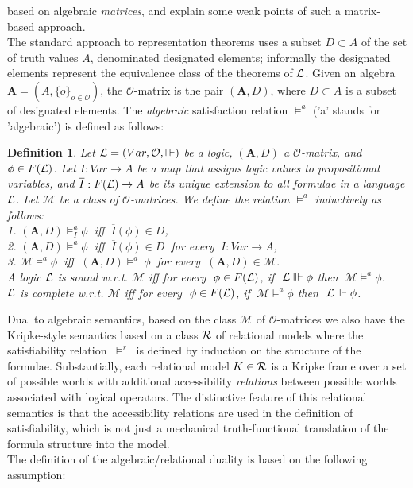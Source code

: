 \documentclass[10pt,twocolumn]{article}
\newcommand{\M}{\mathcal{M}} \newcommand{\N}{\mathcal{N}}
\renewcommand{\O}{\mathcal{O}} \renewcommand{\P}{\mathcal{P}}
\newtheorem{definition}{Definition}
\begin{document}
based on
algebraic \emph{matrices}, and explain some weak points of such a matrix-based approach.\\
  The standard approach to representation
theorems uses a subset $D \subset A$ of the set of truth values $A$,
denominated designated elements; informally the
designated elements represent the equivalence class of the theorems
of $\mathcal{L}$. Given an algebra $\textbf{A} = (A, \{o\}_{o \in \O})$, the
$\O$-matrix is the pair $(\textbf{A},D)$, where $D \subset A$ is a
subset of designated elements. The \emph{algebraic} satisfaction
relation $\models^a$ ('a' stands for 'algebraic') is defined as
follows:
\begin{definition} \label{def:matr} Let $\L = (Var, \O,
\Vvdash)$ be a logic, $(\textbf{A},D)$ a $\O$-matrix, and $\phi \in
F(\mathcal{L})$. Let $I:Var \rightarrow A$ be a map that assigns logic values
to propositional variables, and $\overline{I}:F(\mathcal{L}) \rightarrow A$
be its unique extension to all formulae in a language $\mathcal{L}$. Let $\M$
be a class of $\O$-matrices. We  define  the relation $\models^a$
inductively as
follows:\\
1. $(\textbf{A},D)\models^a_I\phi~$ iff $~ \overline{I}(\phi)
\in D$,\\
2. $(\textbf{A},D)\models^a\phi~$ iff $~\overline{I}(\phi)
\in D~$ for every $~I:Var \rightarrow A$,\\
3. $\M \models^a\phi~$ iff $~(\textbf{A},D)\models^a~\phi~$
for every $~(\textbf{A},D) \in \M$.\\
A logic $\mathcal{L}$ is sound w.r.t. $\M$ iff for every $~\phi \in F(\mathcal{L})$,
if $~\mathcal{L} \Vvdash \phi$ then $~\M \models^a\phi$.\\
$\mathcal{L}$ is complete w.r.t. $\M$ iff for every  $~\phi \in F(\mathcal{L})$, if
$~\M \models^a\phi$ then $~\mathcal{L} \Vvdash \phi$.
\end{definition}
 Dual to
algebraic semantics, based on the class $\M$ of $\O$-matrices we
also have the Kripke-style semantics based on a class $\mathcal{R}$ of
relational models where the satisfiability relation $~\models^r~$ is
defined by induction on the structure of the formulae.
Substantially, each relational model $K \in \mathcal{R}$ is a Kripke frame
over a set of possible worlds with additional accessibility
\emph{relations} between possible worlds associated with logical
operators. The distinctive feature of this relational semantics is
that the accessibility relations are used in the definition of
satisfiability, which is not just a mechanical truth-functional
translation of the formula structure into the
model.\\
 The definition of the algebraic/relational duality  is based on the following assumption:
\end{document}
